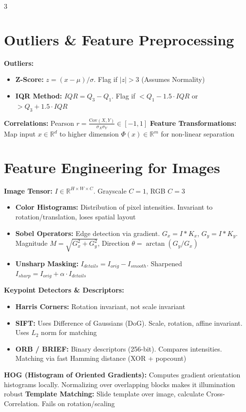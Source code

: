 \documentclass[8pt,landscape]{extarticle}
\begin{document}
\begin{multicols*}{3}
\section{Outliers \& Feature Preprocessing}
\textbf{Outliers:}
\begin{itemize}
    \item \textbf{Z-Score:} $z = (x - \mu)/\sigma$. Flag if $|z| > 3$ (Assumes Normality) %
    \item \textbf{IQR Method:} $IQR = Q_3 - Q_1$. Flag if $< Q_1 - 1.5 \cdot IQR$ or $> Q_3 + 1.5 \cdot IQR$ %
\end{itemize}
\textbf{Correlations:}
Pearson $r = \frac{\text{Cov}(X,Y)}{\sigma_X \sigma_Y} \in [-1, 1]$ %
\textbf{Feature Transformations:}
Map input $x \in \mathbb{R}^d$ to higher dimension $\Phi(x) \in \mathbb{R}^m$ for non-linear separation %

\section{Feature Engineering for Images}
\textbf{Image Tensor:} $I \in \mathbb{R}^{H \times W \times C}$. Grayscale $C=1$, RGB $C=3$ %
\begin{itemize}
    \item \textbf{Color Histograms:} Distribution of pixel intensities. Invariant to rotation/translation, loses spatial layout %
    \item \textbf{Sobel Operators:} Edge detection via gradient. $G_x = I * K_x$, $G_y = I * K_y$. Magnitude $M = \sqrt{G_x^2 + G_y^2}$, Direction $\theta = \arctan(G_y/G_x)$ %
    \item \textbf{Unsharp Masking:} $I_{details} = I_{orig} - I_{smooth}$. Sharpened $I_{sharp} = I_{orig} + \alpha \cdot I_{details}$ %
\end{itemize}
\textbf{Keypoint Detectors \& Descriptors:}
\begin{itemize}
    \item \textbf{Harris Corners:} Rotation invariant, not scale invariant %
    \item \textbf{SIFT:} Uses Difference of Gaussians (DoG). Scale, rotation, affine invariant. Uses $L_2$ norm for matching %
    \item \textbf{ORB / BRIEF:} Binary descriptors (256-bit). Compares intensities. Matching via fast Hamming distance (XOR + popcount) %
\end{itemize}
\textbf{HOG (Histogram of Oriented Gradients):} Computes gradient orientation histograms locally. Normalizing over overlapping blocks makes it illumination robust %
\textbf{Template Matching:} Slide template over image, calculate Cross-Correlation. Fails on rotation/scaling %


\end{multicols*}
\end{document}
